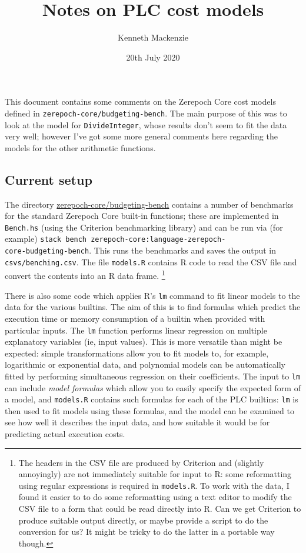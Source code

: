 \documentclass[a4paper]{article}
\title{Notes on PLC cost models}
\author{Kenneth Mackenzie}
\date{20th July 2020}
\begin{document}
\maketitle
\noindent This document contains some comments on the Zerepoch Core cost models
defined in \verb|zerepoch-core/budgeting-bench|.  The main purpose
of this was to look at the model for \verb|DivideInteger|, whose results
don't seem to fit the data very well; however I've got some more general
comments here regarding the models for the other arithmetic functions.

\subsection*{Current setup}  The directory \url{zerepoch-core/budgeting-bench}
contains a number of benchmarks for the standard Zerepoch Core built-in
functions; these are implemented in \verb|Bench.hs| (using the
Criterion benchmarking library) and can be run via (for example)
\verb|stack bench zerepoch-core:|\verb|language-|\verb|zerepoch-|\\ \verb|core-budgeting-bench|.  This runs the benchmarks
and saves the output in \verb|csvs/benching.csv|.  The file
\verb|models.R| contains R code to read the CSV file and convert the
contents into an R data frame.%
\footnote{The headers in the CSV file are produced by Criterion and
  (slightly annoyingly) are not immediately suitable for input to R:
  some reformatting using regular expressions is required in
  \texttt{models.R}.  To work with the data, I found it easier to
  to do some reformatting using a text editor to modify the CSV
  file to a form that could be read directly into R.  Can we get Criterion
  to produce suitable output directly, or maybe provide a script to
  do the conversion for us?  It might be tricky to do the latter in a portable way though.}

There is also some code which applies R's \verb|lm| command to fit
linear models to the data for the various builtins.  The aim of this
is to find formulas which predict the execution time or memory
consumption of a builtin when provided with particular inputs.  The
\texttt{lm} function performs linear regression on multiple
explanatory variables (ie, input values).  This is more versatile than
might be expected: simple transformations allow you to fit models to,
for example, logarithmic or exponential data, and polynomial models
can be automatically fitted by performing simultaneous regression on
their coefficients.  The input to \texttt{lm} can include
\textit{model formulas} which allow you to easily specify the expected
form of a model, and \verb|models.R| contains such formulas for each
of the PLC builtins: \verb|lm| is then used to fit models using these
formulas, and the model can be examined to see how well it describes
the input data, and how suitable it would be for predicting actual
execution costs.
\end{document}
